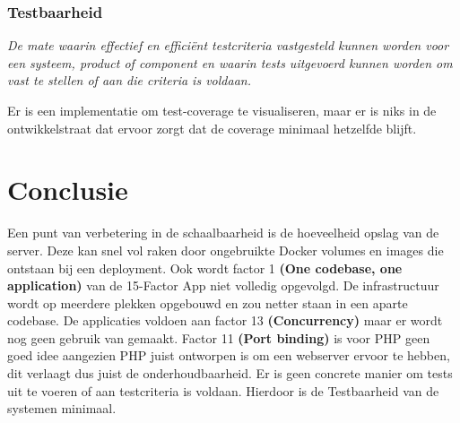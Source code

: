\subsubsection{Testbaarheid}
\textit{De mate waarin effectief en efficiënt testcriteria vastgesteld kunnen worden voor een systeem, product of component en waarin tests uitgevoerd kunnen worden om vast te stellen of aan die criteria is voldaan.}

Er is een implementatie om test-coverage te visualiseren, maar er is niks in de ontwikkelstraat dat ervoor zorgt dat de coverage minimaal hetzelfde blijft. 

\section{Conclusie}
Een punt van verbetering in de schaalbaarheid is de hoeveelheid opslag van de server. Deze kan snel vol raken door ongebruikte Docker volumes en images die ontstaan bij een deployment. Ook wordt factor 1 \textbf{(One codebase, one application)} van de 15-Factor App niet volledig opgevolgd. De infrastructuur wordt op meerdere plekken opgebouwd en zou netter staan in een aparte codebase. De applicaties voldoen aan factor 13 \textbf{(Concurrency)} maar er wordt nog geen gebruik van gemaakt. Factor 11 \textbf{(Port binding)} is voor PHP geen goed idee aangezien PHP juist ontworpen is om een webserver ervoor te hebben, dit verlaagt dus juist de onderhoudbaarheid. Er is geen concrete manier om tests uit te voeren of aan testcriteria is voldaan. Hierdoor is de Testbaarheid van de systemen minimaal.